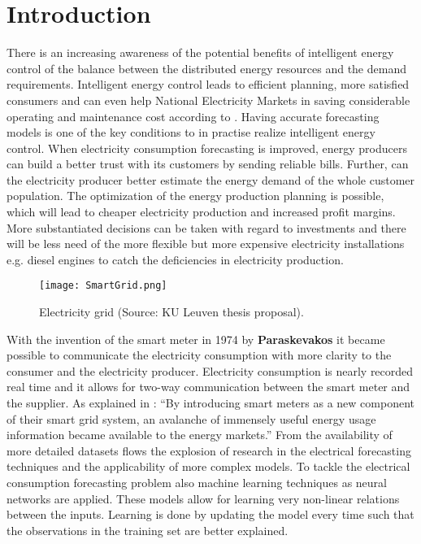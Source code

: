 \chapter{Introduction}

There is an increasing awareness of the potential benefits of intelligent energy control of the balance between the distributed energy resources and the demand requirements. Intelligent energy control leads to efficient planning, more satisfied consumers and can even help National Electricity Markets in saving considerable operating and maintenance cost according to \cite{NarjesFallah2018}. Having accurate forecasting models is one of the key conditions to in practise realize intelligent energy control. When electricity consumption forecasting is improved, energy producers can build a better trust with its customers by sending reliable bills. Further, can the electricity producer better estimate the energy demand of the whole customer population. The optimization of the energy production planning is possible, which will lead to cheaper electricity production and increased profit margins. More substantiated decisions can be taken with regard to investments and there will be less need of the more flexible but more expensive electricity installations e.g. diesel engines to catch the deficiencies in electricity production.\\

\begin{figure}[h!]
	\centering
	\texttt{[image: SmartGrid.png]}
	\caption{Electricity grid (Source: KU Leuven thesis proposal).}
	\label{fig:power_image}
\end{figure}

With the invention of the smart meter in 1974 by \textbf{Paraskevakos} it became possible to communicate the electricity consumption with more clarity to the consumer and the electricity producer. Electricity consumption is nearly recorded real time and it allows for two-way communication between the smart meter and the supplier. As explained in \cite{Depuru2011}: ``By introducing smart meters as a new
component of their smart grid system, an avalanche of immensely useful energy usage information
became available to the energy markets.'' From the availability of more detailed datasets flows the explosion of research in the electrical forecasting techniques and the applicability of more complex models. To tackle the electrical consumption forecasting problem also machine learning techniques as neural networks are applied. These models allow for learning very non-linear relations between the inputs. Learning is done by updating the model every time such that the observations in the training set are better explained.\\

